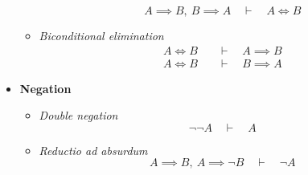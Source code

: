 \begin{itemize}
\begin{itemize}
\[ A \implies B, \  B\implies A \quad\vdash\quad A \iff B \]
\item \textit{Biconditional elimination}
\begin{align*}
A \iff B \quad&\vdash\quad A \implies B \\
A \iff B \quad&\vdash\quad B \implies A
\end{align*}
\end{itemize}
\item \textbf{Negation}
\begin{itemize}
\item \textit{Double negation}
\[ \neg \neg A \quad\vdash\quad A \]
\item \textit{Reductio ad absurdum}
\[ A\implies B, \  A\implies \neg B \quad\vdash\quad \neg A \]
\end{itemize}
\end{itemize}

